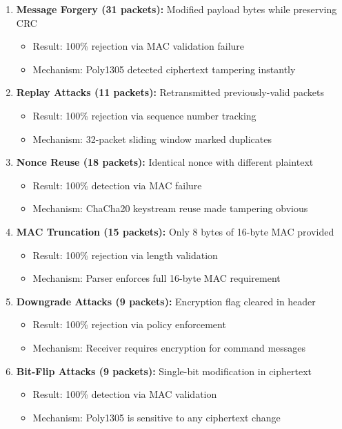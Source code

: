 \documentclass[11pt,a4paper]{article}
\begin{document}
\begin{enumerate}[noitemsep]
    \item \textbf{Message Forgery (31 packets):} Modified payload bytes while preserving CRC
    \begin{itemize}[noitemsep]
        \item Result: 100\% rejection via MAC validation failure
        \item Mechanism: Poly1305 detected ciphertext tampering instantly
    \end{itemize}
    
    \item \textbf{Replay Attacks (11 packets):} Retransmitted previously-valid packets
    \begin{itemize}[noitemsep]
        \item Result: 100\% rejection via sequence number tracking
        \item Mechanism: 32-packet sliding window marked duplicates
    \end{itemize}
    
    \item \textbf{Nonce Reuse (18 packets):} Identical nonce with different plaintext
    \begin{itemize}[noitemsep]
        \item Result: 100\% detection via MAC failure
        \item Mechanism: ChaCha20 keystream reuse made tampering obvious
    \end{itemize}
    
    \item \textbf{MAC Truncation (15 packets):} Only 8 bytes of 16-byte MAC provided
    \begin{itemize}[noitemsep]
        \item Result: 100\% rejection via length validation
        \item Mechanism: Parser enforces full 16-byte MAC requirement
    \end{itemize}
    
    \item \textbf{Downgrade Attacks (9 packets):} Encryption flag cleared in header
    \begin{itemize}[noitemsep]
        \item Result: 100\% rejection via policy enforcement
        \item Mechanism: Receiver requires encryption for command messages
    \end{itemize}
    
    \item \textbf{Bit-Flip Attacks (9 packets):} Single-bit modification in ciphertext
    \begin{itemize}[noitemsep]
        \item Result: 100\% detection via MAC validation
        \item Mechanism: Poly1305 is sensitive to any ciphertext change
    \end{itemize}
\end{enumerate}
\end{document}
